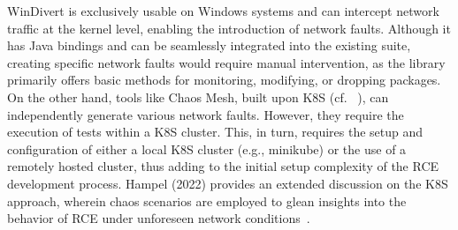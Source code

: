 WinDivert is exclusively usable on Windows systems and can intercept network traffic at the kernel level, enabling the introduction of network faults. Although it has Java bindings and can be seamlessly integrated into the existing suite, creating specific network faults would require manual intervention, as the library primarily offers basic methods for monitoring, modifying, or dropping packages. On the other hand, tools like Chaos Mesh, built upon \ac{K8S} (cf. ~), can independently generate various network faults. However, they require the execution of tests within a \ac{K8S} cluster. This, in turn, requires the setup and configuration of either a local \ac{K8S} cluster (e.g., minikube) or the use of a remotely hosted cluster, thus adding to the initial setup complexity of the \ac{RCE} development process. Hampel (2022) provides an extended discussion on the \ac{K8S} approach, wherein chaos scenarios are employed to glean insights into the behavior of \ac{RCE} under unforeseen network conditions~\cite{Hampel2022}.

